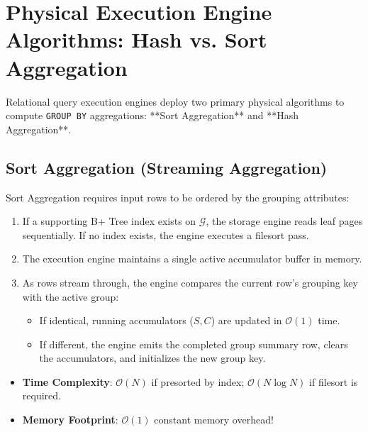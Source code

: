 \documentclass[10pt,twocolumn,letterpaper]{article}
\begin{document}
\section{Physical Execution Engine Algorithms: Hash vs. Sort Aggregation}
\label{sec:physical_aggregation}

Relational query execution engines deploy two primary physical algorithms to compute \texttt{GROUP BY} aggregations: **Sort Aggregation** and **Hash Aggregation**.

\subsection{Sort Aggregation (Streaming Aggregation)}
Sort Aggregation requires input rows to be ordered by the grouping attributes:
\begin{enumerate}
    \item If a supporting B+ Tree index exists on $\mathcal{G}$, the storage engine reads leaf pages sequentially. If no index exists, the engine executes a filesort pass.
    \item The execution engine maintains a single active accumulator buffer in memory.
    \item As rows stream through, the engine compares the current row's grouping key with the active group:
    \begin{itemize}
        \item If identical, running accumulators ($S, C$) are updated in $\mathcal{O}(1)$ time.
        \item If different, the engine emits the completed group summary row, clears the accumulators, and initializes the new group key.
    \end{itemize}
\end{enumerate}
\begin{itemize}
    \item \textbf{Time Complexity}: $\mathcal{O}(N)$ if presorted by index; $\mathcal{O}(N \log N)$ if filesort is required.
    \item \textbf{Memory Footprint}: $\mathcal{O}(1)$ constant memory overhead!
\end{itemize}
\end{document}
